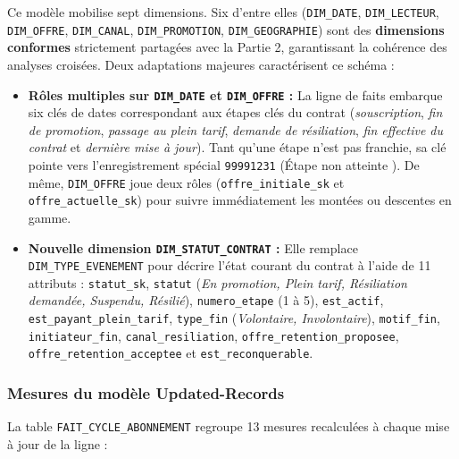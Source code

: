 \documentclass[a4paper,12pt]{article}
\begin{document}
Ce modèle mobilise sept dimensions. Six d'entre elles (\texttt{DIM\_DATE}, \texttt{DIM\_LECTEUR}, \texttt{DIM\_OFFRE}, \texttt{DIM\_CANAL}, \texttt{DIM\_PROMOTION}, \texttt{DIM\_GEOGRAPHIE}) sont des \textbf{dimensions conformes} strictement partagées avec la Partie 2, garantissant la cohérence des analyses croisées. Deux adaptations majeures caractérisent ce schéma :
\begin{itemize}
  \item \textbf{Rôles multiples sur \texttt{DIM\_DATE} et \texttt{DIM\_OFFRE} :} La ligne de faits embarque six clés de dates correspondant aux étapes clés du contrat (\emph{souscription}, \emph{fin de promotion}, \emph{passage au plein tarif}, \emph{demande de résiliation}, \emph{fin effective du contrat} et \emph{dernière mise à jour}). Tant qu'une étape n'est pas franchie, sa clé pointe vers l'enregistrement spécial \texttt{99991231} (\og Étape non atteinte \fg{}). De même, \texttt{DIM\_OFFRE} joue deux rôles (\texttt{offre\_initiale\_sk} et \texttt{offre\_actuelle\_sk}) pour suivre immédiatement les montées ou descentes en gamme.
  \item \textbf{Nouvelle dimension \texttt{DIM\_STATUT\_CONTRAT} :} Elle remplace \texttt{DIM\_TYPE\_EVENEMENT} pour décrire l'état courant du contrat à l'aide de 11 attributs : \texttt{statut\_sk}, \texttt{statut} (\emph{En promotion, Plein tarif, Résiliation demandée, Suspendu, Résilié}), \texttt{numero\_etape} (1 à 5), \texttt{est\_actif}, \texttt{est\_payant\_plein\_tarif}, \texttt{type\_fin} (\emph{Volontaire, Involontaire}), \texttt{motif\_fin}, \texttt{initiateur\_fin}, \texttt{canal\_resiliation}, \texttt{offre\_retention\_proposee}, \texttt{offre\_retention\_acceptee} et \texttt{est\_reconquerable}.
\end{itemize}

\subsubsection*{Mesures du modèle Updated-Records}

La table \texttt{FAIT\_CYCLE\_ABONNEMENT} regroupe 13 mesures recalculées à chaque mise à jour de la ligne :
\end{document}
